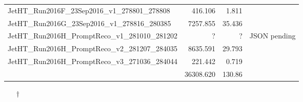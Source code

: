 \begin{center}
\begin{tabular}{ l r r l}
      JetHT\_Run2016F\_23Sep2016\_v1\_278801\_278808 &  416.106 & 1.811 \\
      JetHT\_Run2016G\_23Sep2016\_v1\_278816\_280385 & 7257.855 & 35.436 \\
      JetHT\_Run2016H\_PromptReco\_v1\_281010\_281202 & ? & ? & JSON pending \\
      JetHT\_Run2016H\_PromptReco\_v2\_281207\_284035 & 8635.591 & 29.793 & \\
      JetHT\_Run2016H\_PromptReco\_v3\_271036\_284044 & 221.442 & 0.719 & \\
      \hline
      & 36308.620 & 130.86 & \\
    \end{tabular}
    \normalsize
  \end{center}

\vspace{0.2cm}
\begin{itemize}
\item[$\dagger$] 
\end{itemize}
